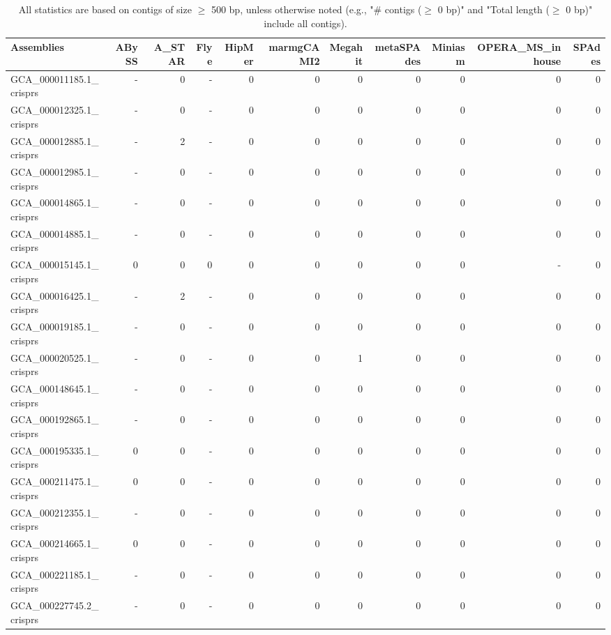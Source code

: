 \documentclass[12pt,a4paper]{article}
\begin{document}
\begin{table}[ht]
\begin{center}
\caption{All statistics are based on contigs of size $\geq$ 500 bp, unless otherwise noted (e.g., "\# contigs ($\geq$ 0 bp)" and "Total length ($\geq$ 0 bp)" include all contigs).}
\begin{tabular}{|l*{10}{|r}|}
\hline
Assemblies & ABySS & A\_STAR & Flye & HipMer & marmgCAMI2 & Megahit & metaSPAdes & Miniasm & OPERA\_MS\_inhouse & SPAdes \\ \hline
GCA\_000011185.1\_crisprs & - & 0 & - & 0 & 0 & 0 & 0 & 0 & 0 & 0 \\ \hline
GCA\_000012325.1\_crisprs & - & 0 & - & 0 & 0 & 0 & 0 & 0 & 0 & 0 \\ \hline
GCA\_000012885.1\_crisprs & - & 2 & - & 0 & 0 & 0 & 0 & 0 & 0 & 0 \\ \hline
GCA\_000012985.1\_crisprs & - & 0 & - & 0 & 0 & 0 & 0 & 0 & 0 & 0 \\ \hline
GCA\_000014865.1\_crisprs & - & 0 & - & 0 & 0 & 0 & 0 & 0 & 0 & 0 \\ \hline
GCA\_000014885.1\_crisprs & - & 0 & - & 0 & 0 & 0 & 0 & 0 & 0 & 0 \\ \hline
GCA\_000015145.1\_crisprs & 0 & 0 & 0 & 0 & 0 & 0 & 0 & 0 & - & 0 \\ \hline
GCA\_000016425.1\_crisprs & - & 2 & - & 0 & 0 & 0 & 0 & 0 & 0 & 0 \\ \hline
GCA\_000019185.1\_crisprs & - & 0 & - & 0 & 0 & 0 & 0 & 0 & 0 & 0 \\ \hline
GCA\_000020525.1\_crisprs & - & 0 & - & 0 & 0 & 1 & 0 & 0 & 0 & 0 \\ \hline
GCA\_000148645.1\_crisprs & - & 0 & - & 0 & 0 & 0 & 0 & 0 & 0 & 0 \\ \hline
GCA\_000192865.1\_crisprs & - & 0 & - & 0 & 0 & 0 & 0 & 0 & 0 & 0 \\ \hline
GCA\_000195335.1\_crisprs & 0 & 0 & - & 0 & 0 & 0 & 0 & 0 & 0 & 0 \\ \hline
GCA\_000211475.1\_crisprs & 0 & 0 & - & 0 & 0 & 0 & 0 & 0 & 0 & 0 \\ \hline
GCA\_000212355.1\_crisprs & - & 0 & - & 0 & 0 & 0 & 0 & 0 & 0 & 0 \\ \hline
GCA\_000214665.1\_crisprs & 0 & 0 & - & 0 & 0 & 0 & 0 & 0 & 0 & 0 \\ \hline
GCA\_000221185.1\_crisprs & - & 0 & - & 0 & 0 & 0 & 0 & 0 & 0 & 0 \\ \hline
GCA\_000227745.2\_crisprs & - & 0 & - & 0 & 0 & 0 & 0 & 0 & 0 & 0 \\ \hline

\end{tabular}
\end{center}
\end{table}
\end{document}
